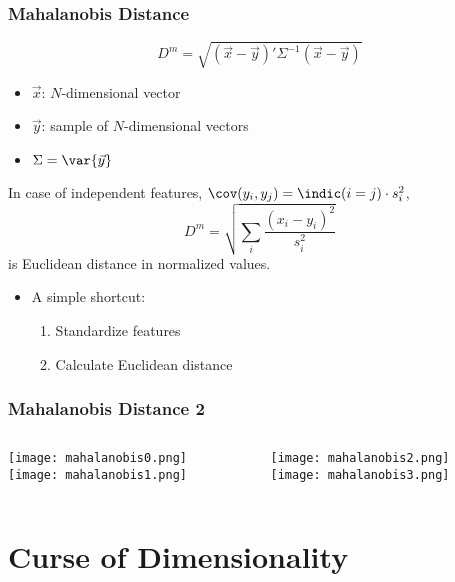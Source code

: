 \documentclass[mathserif, xcolor=table, svgnames]{beamer}
\begin{document}
\begin{frame}
  \frametitle{Mahalanobis Distance}
  \begin{equation*}
    D^{m} = \sqrt{
      (\vec{x} - \vec{y})' \Sigma^{-1} (\vec{x} - \vec{y})
    }
  \end{equation*}
  \begin{itemize}
  \item $\vec{x}$: $N$-dimensional vector
  \item $\vec{y}$: sample of $N$-dimensional vectors
  \item $\Sigma = \var{\vec{y}}$
  \end{itemize}
  In case of independent features, $\cov(y_{i}, y_{j}) = 
  \indic(i = j) \cdot s_{i}^{2}$,
  \begin{equation*}
    D^{m} = \sqrt{
      \sum_{i} \frac{(x_{i} - y_{i})^{2}}{s_{i}^{2}}
    }
  \end{equation*}
  is Euclidean distance in normalized values.
  \begin{itemize}
  \item A simple shortcut:
    \begin{enumerate}
    \item Standardize features
    \item Calculate Euclidean distance
    \end{enumerate}
  \end{itemize}
\end{frame}

\begin{frame}
  \frametitle{Mahalanobis Distance 2}
  \begin{columns}
    \begin{column}{0.5\linewidth}
      \texttt{[image: mahalanobis0.png]}
      \\
      \texttt{[image: mahalanobis1.png]}
    \end{column}
    \begin{column}{0.5\linewidth}
      \texttt{[image: mahalanobis2.png]}
      \\
      \texttt{[image: mahalanobis3.png]}
    \end{column}
  \end{columns}
\end{frame}

{

}

\section{Curse of Dimensionality}
\frame{\tableofcontents[currentsection]}
 
{

}
 
\end{document}
